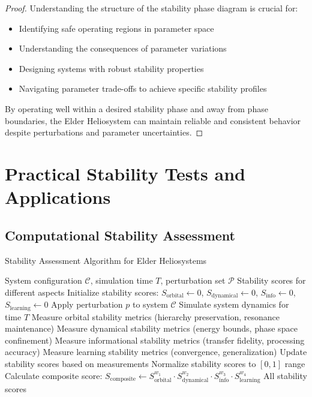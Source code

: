 \begin{proof}
Understanding the structure of the stability phase diagram is crucial for:
\begin{itemize}
    \item Identifying safe operating regions in parameter space
    \item Understanding the consequences of parameter variations
    \item Designing systems with robust stability properties
    \item Navigating parameter trade-offs to achieve specific stability profiles
\end{itemize}

By operating well within a desired stability phase and away from phase boundaries, the Elder Heliosystem can maintain reliable and consistent behavior despite perturbations and parameter uncertainties.
\end{proof}

\section{Practical Stability Tests and Applications}

\subsection{Computational Stability Assessment}

\begin{algorithm}[H]
\caption{Stability Assessment Algorithm for Elder Heliosystems}
\begin{algorithmic}[1]
\REQUIRE System configuration $\mathcal{C}$, simulation time $T$, perturbation set $\mathcal{P}$
\ENSURE Stability scores for different aspects
\STATE Initialize stability scores: $S_{\text{orbital}} \gets 0$, $S_{\text{dynamical}} \gets 0$, $S_{\text{info}} \gets 0$, $S_{\text{learning}} \gets 0$
    \STATE Apply perturbation $p$ to system $\mathcal{C}$
    \STATE Simulate system dynamics for time $T$
    \STATE Measure orbital stability metrics (hierarchy preservation, resonance maintenance)
    \STATE Measure dynamical stability metrics (energy bounds, phase space confinement)
    \STATE Measure informational stability metrics (transfer fidelity, processing accuracy)
    \STATE Measure learning stability metrics (convergence, generalization)
    \STATE Update stability scores based on measurements
\ENDFOR
\STATE Normalize stability scores to $[0, 1]$ range
\STATE Calculate composite score: $S_{\text{composite}} \gets S_{\text{orbital}}^{w_1} \cdot S_{\text{dynamical}}^{w_2} \cdot S_{\text{info}}^{w_3} \cdot S_{\text{learning}}^{w_4}$
\RETURN All stability scores
\end{algorithmic}
\end{algorithm}

